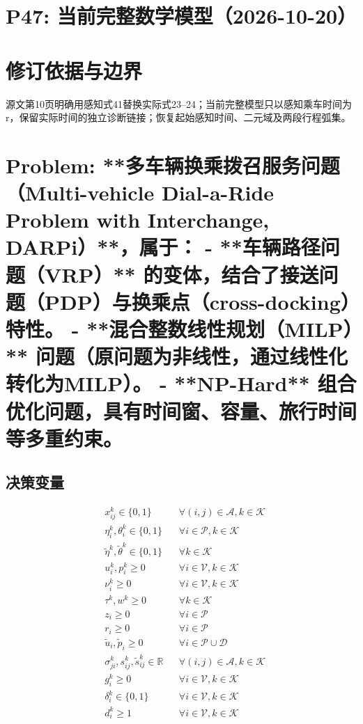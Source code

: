 \documentclass[11pt]{ctexart}
\begin{document}
\section*{P47: 当前完整数学模型（2026-10-20）}
\section*{修订依据与边界}源文第10页明确用感知式41替换实际式23–24；当前完整模型只以感知乘车时间为r，保留实际时间的独立诊断链接；恢复起始感知时间、二元域及两段行程弧集。


\section*{Problem: **多车辆换乘拨召服务问题（Multi-vehicle Dial-a-Ride Problem with Interchange, DARPi）**，属于：  
- **车辆路径问题（VRP）** 的变体，结合了接送问题（PDP）与换乘点（cross-docking）特性。  
- **混合整数线性规划（MILP）** 问题（原问题为非线性，通过线性化转化为MILP）。  
- **NP-Hard** 组合优化问题，具有时间窗、容量、旅行时间等多重约束。}



\subsection*{决策变量}
\begin{align*}
& x_{ij}^k \in \{0, 1\} && \forall (i,j) \in \mathcal{A}, k \in \mathcal{K} \\
& \eta_i^k, \theta_i^k \in \{0, 1\} && \forall i \in \mathcal{P}, k \in \mathcal{K} \\
& \tilde{\eta}^k, \tilde{\theta}^k \in \{0,1\} && \forall k \in \mathcal{K} \\
& u_i^k, p_i^k \ge 0 && \forall i \in \mathcal{V}, k \in \mathcal{K} \\
& \nu_i^k \ge 0 && \forall i \in \mathcal{V}, k \in \mathcal{K} \\
& \tau^k, w^k \ge 0 && \forall k \in \mathcal{K} \\
& z_i \ge 0 && \forall i \in \mathcal{P} \\
& r_i \ge 0 && \forall i \in \mathcal{P} \\
& \tilde{u}_i, \tilde{p}_i \ge 0 && \forall i \in \mathcal{P} \cup \mathcal{D} \\
& \sigma_{ji}^k, s_{ij}^k, \tilde{s}_{ij}^k \in \mathbb{R} && \forall (i,j) \in \mathcal{A}, k \in \mathcal{K} \\
& g_i^k \ge 0 && \forall i \in \mathcal{V}, k \in \mathcal{K} \\
& \delta_i^k \in \{0, 1\} && \forall i \in \mathcal{V}, k \in \mathcal{K} \\
& d_i^k \ge 1 && \forall i \in \mathcal{V}, k \in \mathcal{K}
\end{align*}
\end{document}

